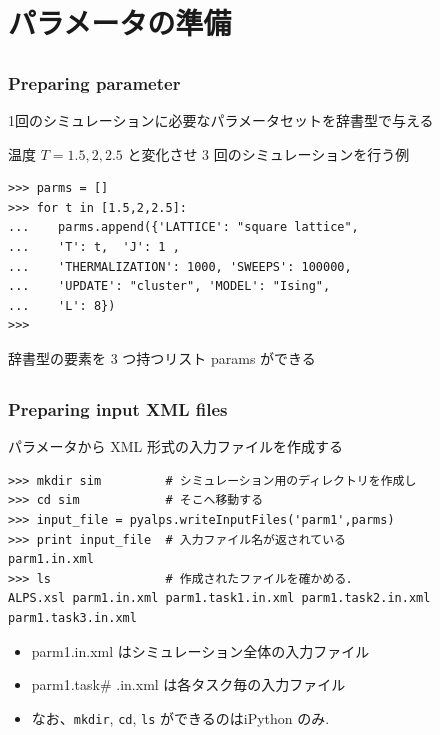 \section{パラメータの準備}

\subsection*{\redm\whiteb\greenb}
\begin{frame}[t,fragile]
\frametitle{Preparing parameter}

1回のシミュレーションに必要なパラメータセットを辞書型で与える


温度 $T = 1.5, 2, 2.5$ と変化させ 3 回のシミュレーションを行う例

\begin{lstlisting}
>>> parms = []
>>> for t in [1.5,2,2.5]:
...    parms.append({'LATTICE': "square lattice", 
...    'T': t,  'J': 1 ,
...    'THERMALIZATION': 1000, 'SWEEPS': 100000,
...    'UPDATE': "cluster", 'MODEL': "Ising",
...    'L': 8})
>>>
\end{lstlisting}

辞書型の要素を 3 つ持つリスト params ができる
\end{frame}

\subsection*{\redm\whiteb\greenb}
\begin{frame}[t,fragile]
\frametitle{Preparing input XML files}
パラメータから XML 形式の入力ファイルを作成する
\begin{lstlisting}
>>> mkdir sim         # シミュレーション用のディレクトリを作成し
>>> cd sim            # そこへ移動する
>>> input_file = pyalps.writeInputFiles('parm1',parms)
>>> print input_file  # 入力ファイル名が返されている
parm1.in.xml
>>> ls                # 作成されたファイルを確かめる．
ALPS.xsl parm1.in.xml parm1.task1.in.xml parm1.task2.in.xml parm1.task3.in.xml
\end{lstlisting}
\begin{itemize}
 \item parm1.in.xml はシミュレーション全体の入力ファイル
 \item parm1.task\# .in.xml は各タスク毎の入力ファイル
 \item なお、\verb|mkdir|, \verb|cd|, \verb|ls| ができるのはiPython のみ.
\end{itemize}

\end{frame}

